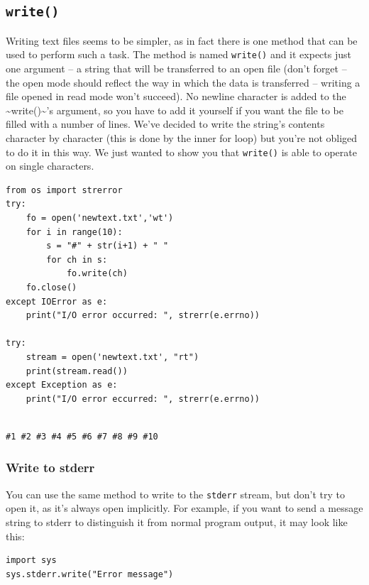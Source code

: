 \documentclass[11pt]{article}
\begin{document}
\subsection{\texttt{write()}}
\label{sec:org5096128}
Writing text files seems to be simpler, as in fact there is one method
that can be used to perform such a task.  The method is named
\texttt{write()} and it expects just one argument – a string that will be
transferred to an open file (don’t forget – the open mode should
reflect the way in which the data is transferred – writing a file
opened in read mode won’t succeed).  No newline character is added to
the \textasciitilde{}write()\textasciitilde{}’s argument, so you have to add it yourself if you want
the file to be filled with a number of lines. We’ve decided to write
the string’s contents character by character (this is done by the
inner for loop) but you’re not obliged to do it in this way. We just
wanted to show you that \texttt{write()} is able to operate on single
characters.

\begin{verbatim}
from os import strerror
try:
	fo = open('newtext.txt','wt')
	for i in range(10):
		s = "#" + str(i+1) + " "
		for ch in s:
			fo.write(ch)
	fo.close()
except IOError as e:
	print("I/O error occurred: ", strerr(e.errno))

try:
    stream = open('newtext.txt', "rt")
    print(stream.read())
except Exception as e:
	print("I/O error eccurred: ", strerr(e.errno))


\end{verbatim}

\begin{verbatim}
#1 #2 #3 #4 #5 #6 #7 #8 #9 #10 
\end{verbatim}

\subsubsection{Write to stderr}
\label{sec:orgcabd798}
You can use the same method to write to the \texttt{stderr} stream, but
don’t try to open it, as it’s always open implicitly. For example, if
you want to send a message string to stderr to distinguish it from
normal program output, it may look like this:

\begin{verbatim}
import sys
sys.stderr.write("Error message")
\end{verbatim}


\newpage
\end{document}
